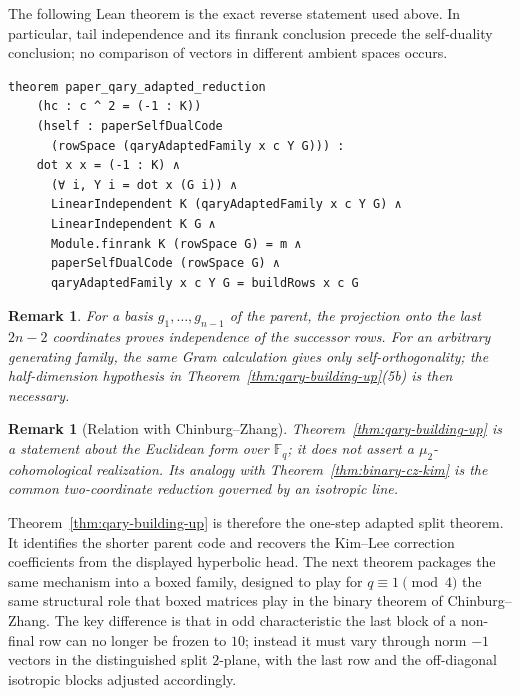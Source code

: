\documentclass[12pt]{article}
\newtheorem{remark}[theorem]{Remark}
\newcommand{\F}{\mathbb{F}}
\begin{document}
\noindent
The following Lean theorem is the exact reverse statement used above.  In
particular, tail independence and its finrank conclusion precede the
self-duality conclusion; no comparison of vectors in different ambient
spaces occurs.

\begin{lstlisting}[caption={Lean for Theorem~\ref{thm:qary-building-up}.}]
theorem paper_qary_adapted_reduction
    (hc : c ^ 2 = (-1 : K))
    (hself : paperSelfDualCode
      (rowSpace (qaryAdaptedFamily x c Y G))) :
    dot x x = (-1 : K) ∧
      (∀ i, Y i = dot x (G i)) ∧
      LinearIndependent K (qaryAdaptedFamily x c Y G) ∧
      LinearIndependent K G ∧
      Module.finrank K (rowSpace G) = m ∧
      paperSelfDualCode (rowSpace G) ∧
      qaryAdaptedFamily x c Y G = buildRows x c G
\end{lstlisting}

\begin{remark}
{\rm
For a basis \(g_1,\ldots,g_{n-1}\) of the parent, the projection onto the
last \(2n-2\) coordinates proves independence of the successor rows.  For an
arbitrary generating family, the same Gram calculation gives only
self-orthogonality; the half-dimension hypothesis in
Theorem~\ref{thm:qary-building-up}(5b) is then necessary.
}
\end{remark}

\medskip

\begin{remark}[Relation with Chinburg--Zhang]
{\rm
Theorem~\ref{thm:qary-building-up} is a statement about the Euclidean form
over \(\F_q\); it does not assert a \(\mu_2\)-cohomological realization.  Its
analogy with Theorem~\ref{thm:binary-cz-kim} is the common two-coordinate
reduction governed by an isotropic line.
}
\end{remark}


Theorem~\ref{thm:qary-building-up} is therefore the one-step adapted split theorem. It identifies the shorter parent code and recovers the Kim--Lee correction coefficients from the displayed hyperbolic head. The next theorem packages the same mechanism into a boxed family, designed to play for \(q\equiv 1\pmod 4\) the same structural role that boxed matrices play in the binary theorem of Chinburg--Zhang. The key difference is that in odd characteristic the last block of a non-final row can no longer be frozen to \(10\); instead it must vary through norm \(-1\) vectors in the distinguished split \(2\)-plane, with the last row and the off-diagonal isotropic blocks adjusted accordingly.
\end{document}

